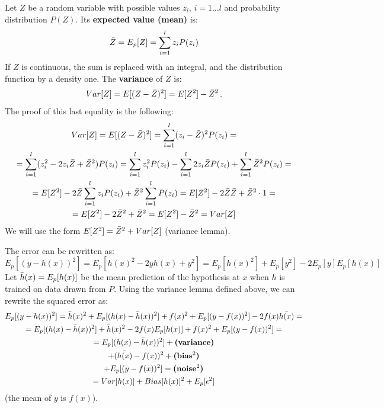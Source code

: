 Let $Z$ be a random variable with possible values $z_i, \, i = 1 \dots l$ and probability distribution $P(Z)$. Its \textbf{expected value (mean)} is:
\begin{equation*}
    \Bar{Z} = E_p[Z] = \sum_{i=1}^l z_iP(z_i)
\end{equation*}
If $Z$ is continuous, the sum is replaced with an integral, and the distribution function by a density one. The \textbf{variance} of $Z$ is:
\begin{equation*}
    Var[Z] = E[(Z - \Bar{Z})^2] = E[Z^2] - \Bar{Z}^2 \,.
\end{equation*}
The proof of this last equality is the following:
\begin{gather*}
    Var[Z] = E[(Z - \Bar{Z})^2] = \sum_{i=1}^l (z_i - \Bar{Z})^2 P(z_i) = \\
    = \sum_{i=1}^l (z_i^2 - 2 z_i \Bar{Z} + \Bar{Z}^2) P(z_i) = \sum_{i=1}^l z_i^2 P(z_i) - \sum_{i=1}^l 2 z_i \Bar{Z} P(z_i) + \sum_{i=1}^l \Bar{Z}^2 P(z_i) = \\
     = E[Z^2] - 2\Bar{Z} \sum_{i=1}^l z_i P(z_i) + \Bar{Z}^2 \sum_{i=1}^l P(z_i) = E[Z^2] - 2 \Bar{Z} \Bar{Z} + \Bar{Z}^2 \cdot 1 = \\
     = E[Z^2] - 2 \Bar{Z}^2 + \Bar{Z}^2 = E[Z^2] - \Bar{Z}^2 = Var[Z]
\end{gather*}
We will use the form $E[Z^2] = \Bar{Z}^2 + Var[Z]$ (variance lemma).

The error can be rewritten as:
\begin{equation*}
    E_p[(y - h(x))^2] = E_p[h(x)^2 - 2yh(x) + y^2] = E_p[h(x)^2] + E_p[y^2] - 2E_p[y]E_p[h(x)]
\end{equation*}
Let $\Bar{h}(x) = E_p[h(x)]$ be the mean prediction of the hypothesis at $x$ when $h$ is trained on data drawn from $P$. Using the variance lemma defined above, we can rewrite the squared error as:
\begin{gather*}
    E_p[(y - h(x))^2] = \Bar{h}(x)^2 + E_p[(h(x) - \Bar{h}(x))^2] + f(x)^2 + E_p[(y - f(x))^2] - 2f(x)\Bar{h(x)} = \\
    = E_p[(h(x) - \Bar{h}(x))^2] + \Bar{h}(x)^2 - 2f(x)E_p[h(x)] + f(x)^2 + E_p[(y - f(x))^2] = \\
    = E_p[(h(x) - \Bar{h}(x))^2] + \textbf{(variance)}\\
    + (\Bar{h(x)} - f(x))^2 + \textbf{(bias$^2$)} \\
    + E_p[(y - f(x))^2] = \textbf{(noise$^2$)} \\
    = Var[h(x)] + Bias[h(x)]^2 + E_p[\epsilon^2]
\end{gather*}
(the mean of $y$ is $f(x)$).

